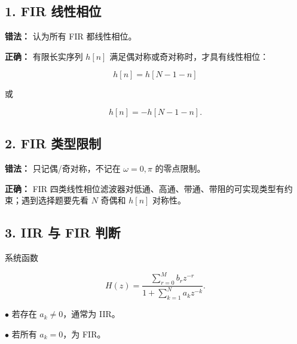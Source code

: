 \documentclass[11pt]{ctexart}
\begin{document}
\subsection*{1. FIR 线性相位}



\textbf{错法：} 认为所有 FIR 都线性相位。\par



\textbf{正确：} 有限长实序列 \(h[n]\) 满足偶对称或奇对称时，才具有线性相位：\par

\[

h[n]=h[N-1-n]

\]

或\par

\[

h[n]=-h[N-1-n].

\]



\subsection*{2. FIR 类型限制}



\textbf{错法：} 只记偶/奇对称，不记在 \(\omega=0,\pi\) 的零点限制。\par



\textbf{正确：} FIR 四类线性相位滤波器对低通、高通、带通、带阻的可实现类型有约束；遇到选择题要先看 \(N\) 奇偶和 \(h[n]\) 对称性。\par



\subsection*{3. IIR 与 FIR 判断}



系统函数\par

\[

H(z)=\frac{\sum_{r=0}^{M}b_rz^{-r}}{1+\sum_{k=1}^{N}a_kz^{-k}}.

\]



\noindent\(\bullet\) 若存在 \(a_k\ne 0\)，通常为 IIR。\par

\noindent\(\bullet\) 若所有 \(a_k=0\)，为 FIR。\par
\end{document}
